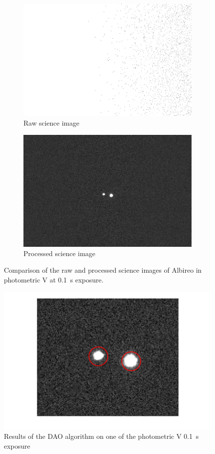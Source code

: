 \documentclass[%
aip,
jmp,
reprint,
floatfix,
nobibfootnote,
]{revtex4-1}
\begin{document}
	\begin{figure}[]
		\begin{subfigure}{\linewidth}
			\centering
			\includegraphics[width=.8\linewidth]{figs/pre.png}
			\caption{Raw science image}
		\end{subfigure}
		\begin{subfigure}{\linewidth}
			\centering
			\includegraphics[width=.8\linewidth]{figs/post.png}
			\caption{Processed science image}
		\end{subfigure}
		\caption{Comparison of the raw and processed science images of Albireo in photometric V at \SI{0.1}{\second} exposure.}
		\label{fig:comparison}
	\end{figure}

	\begin{figure}
		\centering
		\includegraphics[width=\linewidth]{figs/dao.png}
		\caption{Results of the DAO algorithm on one of the photometric V \SI{0.1}{\second} exposure}
		\label{fig:centroids}
	\end{figure}
\end{document}
